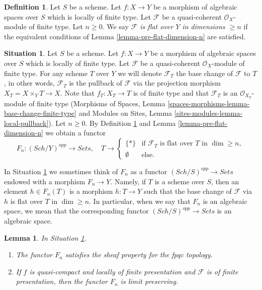 \documentclass{stacks-project}
\theoremstyle{plain}
\newtheorem{lemma}[subsection]{Lemma}
\theoremstyle{definition}
\newtheorem{definition}[subsection]{Definition}
\newtheorem{situation}[subsection]{Situation}
\theoremstyle{remark}
\numberwithin{equation}{subsection}
\def\Sch{\mathit{Sch}}
\begin{document}
\begin{definition}
\label{definition-flat-dimension-n}
Let $S$ be a scheme. Let $f : X \to Y$ be a morphism of algebraic spaces
over $S$ which is locally of finite type.
Let $\mathcal{F}$ be a quasi-coherent $\mathcal{O}_X$-module of finite type.
Let $n \geq 0$.
We say {\it $\mathcal{F}$ is flat over $Y$ in dimensions $\geq n$}
if the equivalent conditions of Lemma \ref{lemma-pre-flat-dimension-n}
are satisfied.
\end{definition}

\begin{situation}
\label{situation-flat-dimension-n}
Let $S$ be a scheme. Let $f : X \to Y$ be a morphism of algebraic spaces
over $S$ which is locally of finite type. Let $\mathcal{F}$ be a quasi-coherent
$\mathcal{O}_X$-module of finite type. For any scheme $T$ over $Y$ we will
denote $\mathcal{F}_T$ the base change of $\mathcal{F}$ to $T$, in other words,
$\mathcal{F}_T$ is the pullback of $\mathcal{F}$ via the projection morphism
$X_T = X \times_Y T \to X$. Note that $f_T : X_T \to T$ is of finite type
and that $\mathcal{F}_T$ is an $\mathcal{O}_{X_T}$-module of finite type
(Morphisms of Spaces, Lemma
\ref{spaces-morphisms-lemma-base-change-finite-type}
and
Modules on Sites, Lemma \ref{sites-modules-lemma-local-pullback}).
Let $n \geq 0$. By Definition \ref{definition-flat-dimension-n} and
Lemma \ref{lemma-pre-flat-dimension-n} we obtain a functor
\begin{equation}
\label{equation-flat-dimension-n}
F_n : (\Sch/Y)^{opp} \longrightarrow \textit{Sets}, \quad
T \longrightarrow \left\{
\begin{matrix}
\{*\} & \text{if }\mathcal{F}_T\text{ is flat over }T\text{ in }\dim \geq n, \\
\emptyset & \text{else.}
\end{matrix}
\right.
\end{equation}
\end{situation}

\noindent
In Situation \ref{situation-flat-dimension-n} we sometimes think of
$F_n$ as a functor $(\Sch/S)^{opp} \to \textit{Sets}$ endowed with a morphism
$F_n \to Y$. Namely, if $T$ is a scheme over $S$, then
an element $h \in F_n(T)$ is a morphism $h : T \to Y$
such that the base change of $\mathcal{F}$ via $h$ is flat over $T$
in $\dim \geq n$. In particular, when we say
that $F_n$ is an algebraic space, we mean that the corresponding
functor $(\Sch/S)^{opp} \to \textit{Sets}$ is an algebraic space.

\begin{lemma}
\label{lemma-flat-dimension-n}
In Situation \ref{situation-flat-dimension-n}.
\begin{enumerate}
\item The functor $F_n$ satisfies the sheaf property for the fpqc topology.
\item If $f$ is quasi-compact and locally of finite presentation
and $\mathcal{F}$ is of finite presentation, then the functor $F_n$ is
limit preserving.
\end{enumerate}
\end{lemma}
\end{document}
